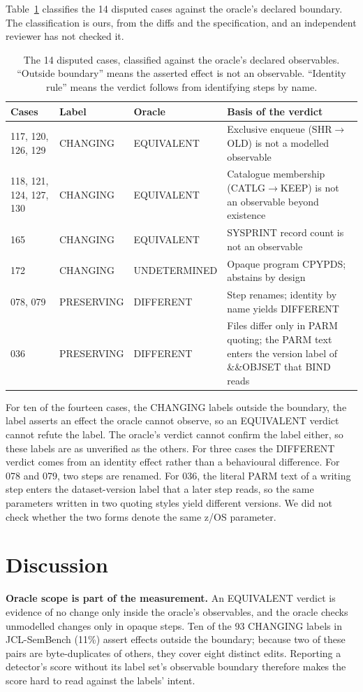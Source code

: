 \documentclass[conference]{IEEEtran}
\begin{document}
Table~\ref{tab:unres} classifies the 14 disputed cases against the oracle's declared boundary. The classification is ours, from the diffs and the specification, and an independent reviewer has not checked it.

\begin{table}[t]
\caption{The 14 disputed cases, classified against the oracle's declared observables. ``Outside boundary'' means the asserted effect is not an observable. ``Identity rule'' means the verdict follows from identifying steps by name.}
\label{tab:unres}
\centering
\small
\begin{tabular}{@{}p{4.4cm}p{2.6cm}p{2.9cm}p{7.6cm}@{}}
\toprule
Cases & Label & Oracle & Basis of the verdict \\
\midrule
117, 120, 126, 129 & CHANGING & EQUIVALENT & Exclusive enqueue (SHR$\to$OLD) is not a modelled observable \\
118, 121, 124, 127, 130 & CHANGING & EQUIVALENT & Catalogue membership (CATLG$\to$KEEP) is not an observable beyond existence \\
165 & CHANGING & EQUIVALENT & SYSPRINT record count is not an observable \\
172 & CHANGING & UNDETERMINED & Opaque program CPYPDS; abstains by design \\
078, 079 & PRESERVING & DIFFERENT & Step renames; identity by name yields DIFFERENT \\
036 & PRESERVING & DIFFERENT & Files differ only in PARM quoting; the PARM text enters the version label of \&\&OBJSET that BIND reads \\
\bottomrule
\end{tabular}
\end{table}

For ten of the fourteen cases, the CHANGING labels outside the boundary, the label asserts an effect the oracle cannot observe, so an EQUIVALENT verdict cannot refute the label. The oracle's verdict cannot confirm the label either, so these labels are as unverified as the others. For three cases the DIFFERENT verdict comes from an identity effect rather than a behavioural difference. For 078 and 079, two steps are renamed. For 036, the literal PARM text of a writing step enters the dataset-version label that a later step reads, so the same parameters written in two quoting styles yield different versions. We did not check whether the two forms denote the same z/OS parameter.

\section{Discussion}
\textbf{Oracle scope is part of the measurement.} An EQUIVALENT verdict is evidence of no change only inside the oracle's observables, and the oracle checks unmodelled changes only in opaque steps. Ten of the 93 CHANGING labels in JCL-SemBench (11\%) assert effects outside the boundary; because two of these pairs are byte-duplicates of others, they cover eight distinct edits. Reporting a detector's score without its label set's observable boundary therefore makes the score hard to read against the labels' intent.
\end{document}
